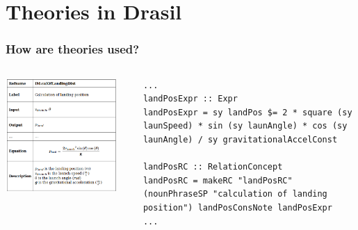 \documentclass[xcolor={dvipsnames}]{beamer}
\begin{document}
\section{Theories in Drasil}

\begin{frame}[fragile]
  \frametitle{How are theories used?}
  
  \begin{columns}
    \begin{column}{0.4\textwidth}
      \begin{center}
        \includegraphics[width=0.9\textwidth]{concreteTheory.png}
      \end{center}
    \end{column}
    \hfill
    \begin{column}{0.575\textwidth}
\begin{verbatim}
...
landPosExpr :: Expr
landPosExpr = sy landPos $= 2 * square (sy launSpeed) * sin (sy launAngle) * cos (sy launAngle) / sy gravitationalAccelConst

landPosRC :: RelationConcept
landPosRC = makeRC "landPosRC" (nounPhraseSP "calculation of landing position") landPosConsNote landPosExpr
...
\end{verbatim}
    \end{column}
  \end{columns}
\end{frame}
\end{document}
